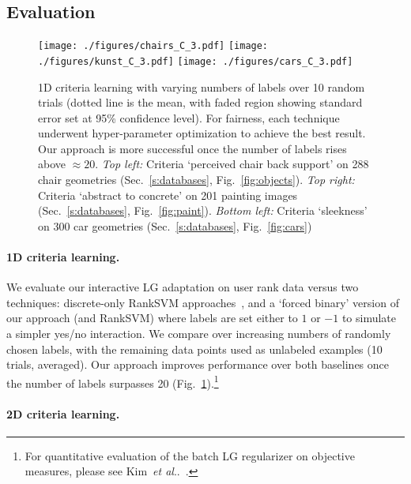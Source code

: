 \documentclass{article}
\makeatletter
\DeclareRobustCommand\onedot{\futurelet\@let@token\@onedot}
\def\@onedot{\ifx\@let@token.\else.\null\fi\xspace}
\def\etal{\emph{et al}\onedot}
\makeatother
\begin{document}
\subsection{Evaluation}
\label{sec:experiments}


\begin{figure}[t]
\centering
\texttt{[image: ./figures/chairs\_C\_3.pdf]}
\texttt{[image: ./figures/kunst\_C\_3.pdf]}
\texttt{[image: ./figures/cars\_C\_3.pdf]}
\vspace{-0.4cm}
\caption{1D criteria learning with varying numbers of labels over 10 random trials (dotted line is the mean, with faded region showing standard error set at 95\% confidence level). For fairness, each technique underwent hyper-parameter optimization to achieve the best result. Our approach is more successful once the number of labels rises above $\approx 20$. \emph{Top left:} Criteria `perceived chair back support' on 288 chair geometries (Sec.~\ref{s:databases}, Fig.~\ref{fig:objects}). \emph{Top right:} Criteria `abstract to concrete' on 201 painting images (Sec.~\ref{s:databases}, Fig.~\ref{fig:paint}). \emph{Bottom left:} Criteria `sleekness' on 300 car geometries (Sec.~\ref{s:databases}, Fig.~\ref{fig:cars})}
\label{fig:performance}
\end{figure}

\paragraph{1D criteria learning.}
\label{s:qualitative}

We evaluate our interactive LG adaptation on user rank data versus two techniques: discrete-only RankSVM approaches~\cite{ParGra11,ShenLin2013}, and a `forced binary' version of our approach (and RankSVM) where labels are set either to $1$ or $-1$ to simulate a simpler yes/no interaction. We compare over increasing numbers of randomly chosen labels, with the remaining data points used as unlabeled examples (10 trials, averaged). Our approach improves performance over both baselines once the number of labels surpasses 20 (Fig.~\ref{fig:performance}).\footnote{For quantitative evaluation of the batch LG regularizer on objective measures, please see Kim~\etal~\cite{KimTompkin2015}.}

\paragraph{2D criteria learning.}
\end{document}
